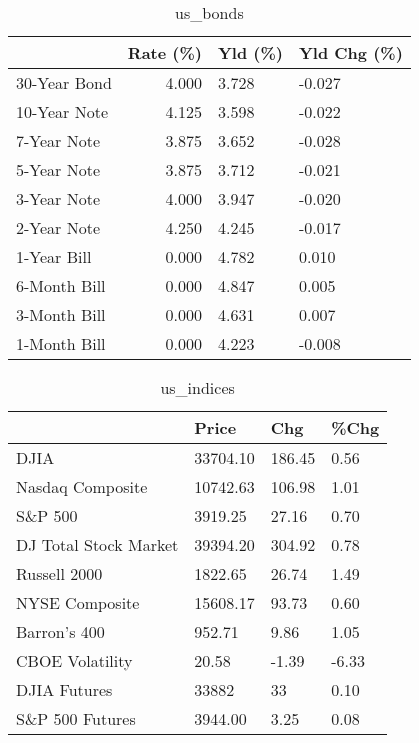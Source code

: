 \documentclass{article}%
\begin{document}
%


\begin{table}[htbp]%
\caption{us\_bonds}%
\centering%
\begin{adjustbox}{width=1\textwidth}%
\begin{tabular}{lrll}
\toprule
             &  Rate (\%) & Yld (\%) & Yld Chg (\%) \\
\midrule
30-Year Bond &     4.000 &   3.728 &      -0.027 \\
10-Year Note &     4.125 &   3.598 &      -0.022 \\
 7-Year Note &     3.875 &   3.652 &      -0.028 \\
 5-Year Note &     3.875 &   3.712 &      -0.021 \\
 3-Year Note &     4.000 &   3.947 &      -0.020 \\
 2-Year Note &     4.250 &   4.245 &      -0.017 \\
 1-Year Bill &     0.000 &   4.782 &       0.010 \\
6-Month Bill &     0.000 &   4.847 &       0.005 \\
3-Month Bill &     0.000 &   4.631 &       0.007 \\
1-Month Bill &     0.000 &   4.223 &      -0.008 \\
\bottomrule
\end{tabular}
%
\end{adjustbox}%
\end{table}

%


\begin{table}[htbp]%
\caption{us\_indices}%
\centering%
\begin{adjustbox}{width=1\textwidth}%
\begin{tabular}{llll}
\toprule
                      &    Price &    Chg &  \%Chg \\
\midrule
                 DJIA & 33704.10 & 186.45 &  0.56 \\
     Nasdaq Composite & 10742.63 & 106.98 &  1.01 \\
              S\&P 500 &  3919.25 &  27.16 &  0.70 \\
DJ Total Stock Market & 39394.20 & 304.92 &  0.78 \\
         Russell 2000 &  1822.65 &  26.74 &  1.49 \\
       NYSE Composite & 15608.17 &  93.73 &  0.60 \\
         Barron's 400 &   952.71 &   9.86 &  1.05 \\
      CBOE Volatility &    20.58 &  -1.39 & -6.33 \\
         DJIA Futures &    33882 &     33 &  0.10 \\
      S\&P 500 Futures &  3944.00 &   3.25 &  0.08 \\
\bottomrule
\end{tabular}
%
\end{adjustbox}%
\end{table}
\end{document}
